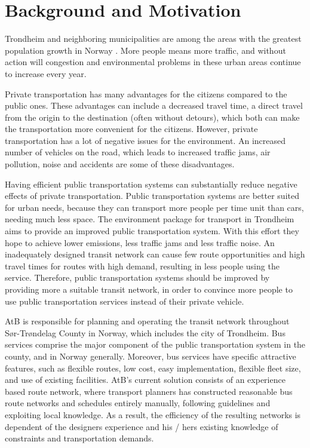 \section{Background and Motivation}

Trondheim and neighboring municipalities are among the areas with the greatest population growth in Norway \citep{website:miljopakken}. More people means more traffic, and without action will congestion and environmental problems in these urban areas continue to increase every year.

Private transportation has many advantages for the citizens compared to the public ones. These advantages can include a decreased travel time, a direct travel from the origin to the destination (often without detours), which both can make the transportation more convenient for the citizens. However, private transportation has a lot of negative issues for the environment. An increased number of vehicles on the road, which leads to increased traffic jams, air pollution, noise and accidents are some of these disadvantages. 

Having efficient public transportation systems can substantially reduce negative effects of private transportation. Public transportation systems are better suited for urban needs, because they can transport more people per time unit than cars, needing much less space. The environment package for transport in Trondheim aims to provide an improved public transportation system\citep{website:miljopakken}. With this effort they hope to achieve lower emissions, less traffic jams and less traffic noise. An inadequately designed transit network can cause few route opportunities and high travel times for routes with high demand, resulting in less people using the service. Therefore, public transportation systems should be improved by providing more a suitable transit network, in order to convince more people to use public transportation services instead of their private vehicle.

AtB\citep{website:atb} is responsible for planning and operating the transit network throughout Sør-Trøndelag County in Norway, which includes the city of Trondheim. Bus services comprise the major component of the public transportation system in the county, and in Norway generally. Moreover, bus services have specific attractive features, such as flexible routes, low cost, easy implementation, flexible fleet size, and use of existing facilities. AtB's current solution consists of an experience based route network, where transport planners has constructed reasonable bus route networks and schedules entirely manually, following guidelines and exploiting local knowledge. As a result, the efficiency of the resulting networks is dependent of the designers experience and his / hers existing knowledge of constraints and transportation demands.

